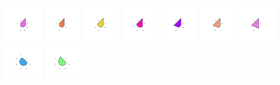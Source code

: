 \documentclass[text.tex]{subfiles}
\begin{document}
\begin{figure}[h!]
\includegraphics[width=0.12\textwidth]{img/results/octagon/octagon_220710_(2_1alpha_2)_005.pdf}
\includegraphics[width=0.12\textwidth]{img/results/octagon/octagon_220710_(2_1alpha_2)_006.pdf}
\includegraphics[width=0.12\textwidth]{img/results/octagon/octagon_220710_(2_1alpha_2)_007.pdf}
\includegraphics[width=0.12\textwidth]{img/results/octagon/octagon_220710_(2_1alpha_2)_008.pdf}
\includegraphics[width=0.12\textwidth]{img/results/octagon/octagon_220710_(2_1alpha_2)_009.pdf}
\includegraphics[width=0.12\textwidth]{img/results/octagon/octagon_220710_(2_1alpha_2)_010.pdf}
\includegraphics[width=0.12\textwidth]{img/results/octagon/octagon_220710_(2_1alpha_2)_011.pdf}
\includegraphics[width=0.12\textwidth]{img/results/octagon/octagon_220710_(2_1alpha_2)_012.pdf}
\includegraphics[width=0.12\textwidth]{img/results/octagon/octagon_220710_(2_1alpha_2)_013.pdf}

\end{figure}
\end{document}
